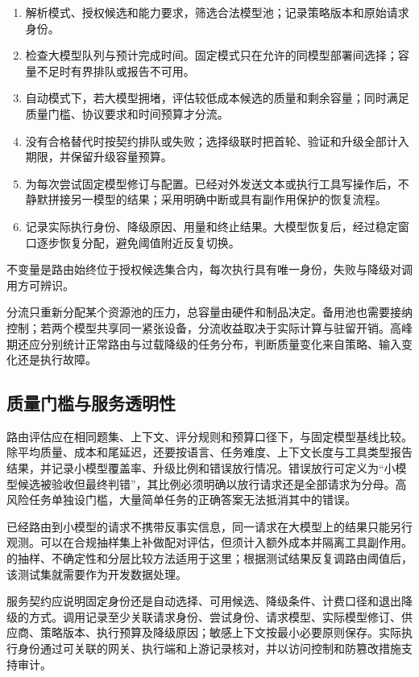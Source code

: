\documentclass[../textbook.tex]{subfiles}
\begin{document}
\begin{algorithm}[容量受限时的模型选择]
\begin{enumerate}
\item 解析模式、授权候选和能力要求，筛选合法模型池；记录策略版本和原始请求身份。
\item 检查大模型队列与预计完成时间。固定模式只在允许的同模型部署间选择；容量不足时有界排队或报告不可用。
\item 自动模式下，若大模型拥堵，评估较低成本候选的质量和剩余容量；同时满足质量门槛、协议要求和时间预算才分流。
\item 没有合格替代时按契约排队或失败；选择级联时把首轮、验证和升级全部计入期限，并保留升级容量预算。
\item 为每次尝试固定模型修订与配置。已经对外发送文本或执行工具写操作后，不静默拼接另一模型的结果；采用明确中断或具有副作用保护的恢复流程。
\item 记录实际执行身份、降级原因、用量和终止结果。大模型恢复后，经过稳定窗口逐步恢复分配，避免阈值附近反复切换。
\end{enumerate}
不变量是路由始终位于授权候选集合内，每次执行具有唯一身份，失败与降级对调用方可辨识。
\end{algorithm}

分流只重新分配某个资源池的压力，总容量由硬件和制品决定。备用池也需要接纳控制；若两个模型共享同一紧张设备，分流收益取决于实际计算与驻留开销。高峰期还应分别统计正常路由与过载降级的任务分布，判断质量变化来自策略、输入变化还是执行故障。

\subsection{质量门槛与服务透明性}
路由评估应在相同题集、上下文、评分规则和预算口径下，与固定模型基线比较。除平均质量、成本和尾延迟，还要按语言、任务难度、上下文长度与工具类型报告结果，并记录小模型覆盖率、升级比例和错误放行情况。错误放行可定义为“小模型候选被验收但最终判错”，其比例必须明确以放行请求还是全部请求为分母。高风险任务单独设门槛，大量简单任务的正确答案无法抵消其中的错误。

已经路由到小模型的请求不携带反事实信息，同一请求在大模型上的结果只能另行观测。可以在合规抽样集上补做配对评估，但须计入额外成本并隔离工具副作用。的抽样、不确定性和分层比较方法适用于这里；根据测试结果反复调路由阈值后，该测试集就需要作为开发数据处理。

服务契约应说明固定身份还是自动选择、可用候选、降级条件、计费口径和退出降级的方式。调用记录至少关联请求身份、尝试身份、请求模型、实际模型修订、供应商、策略版本、执行预算及降级原因；敏感上下文按最小必要原则保存。实际执行身份通过可关联的网关、执行端和上游记录核对，并以访问控制和防篡改措施支持审计。
\end{document}
